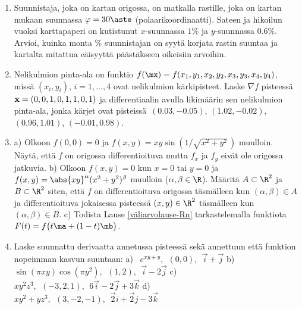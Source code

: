 \begin{enumerate}
\item
Suunnistaja, joka on kartan origossa, on matkalla rastille, joka on kartan mukaan suunnassa
$\varphi=30\aste$ (polaarikoordinaatti). Sateen ja hikoilun vuoksi karttapaperi on kutistunut
$x$-suunnassa $1\%$ ja $y$-suunnassa $0.6\%$. Arvioi, kuinka monta $\%$ suunnistajan on syytä
korjata rastin suuntaa ja kartalta mitattua eäisyyttä päästäkseen oikeisiin arvoihin.

\item Nelikulmion pinta-ala on funktio $f(\mx) = f(x_1, y_1, x_2, y_2, x_3, y_3, x_4, y_4)$,
missä $(x_i, y_i)$, $i = 1,\ldots,4$ ovat nelikulmion kärkipisteet. Laske $\nabla f$ 
pisteessä ${\bf x} = (0,0,1,0,1,1,0,1)$ ja differentiaalin avulla likimäärin sen nelikulmion
pinta-ala, jonka kärjet ovat pisteissä $\,(0.03, -0.05)$, $(1.02,-0.02)$, $(0.96, 1.01)$, 
$(-0.01, 0.98)$.

\item \label{H-udif-3: differentioituvuus}
a) Olkoon $f(0,0)=0$ ja $f(x,y)=xy\sin(1/\sqrt{x^2+y^2}\,)$ muulloin. Näytä, että $f$ on
origossa differentioituva mutta $f_x$ ja $f_y$ eivät ole origossa jatkuvia.\vspace{1mm}\newline
b) Olkoon $f(x,y)=0$ kun $x=0$ tai $y=0$ ja $f(x,y)=\abs{xy}^\alpha(x^2+y^2)^\beta$ muulloin 
($\alpha,\beta\in\R$). Määritä $A\subset\R^2$ ja $B\subset\R^2$ siten, että $f$ on
differentioituva origossa täsmälleen kun $(\alpha,\beta) \in A$ ja differentioituva jokaisessa
pisteessä $(x,y)\in\R^2$ täsmälleen kun $(\alpha,\beta) \in B$. \vspace{1mm}\newline
c) Todista Lause \ref{väliarvolause-Rn} tarkastelemalla funktiota
$F(t)=f\bigl(t\ma+(1-t)\mb\bigr)$.

\item
Laske suunnattu derivaatta annetussa pisteessä sekä annettuun että funktion nopeimman kasvun
suuntaan: \vspace{1mm}\newline
a) \ $e^{xy+y},\ \ (0,0),\ \ \vec i+\vec j$ \vspace{0.8mm}\newline
b) \ $\sin(\pi xy)\cos(\pi y^2),\ \ (1,2),\ \ \vec i-2\vec j$ \vspace{0.3mm}\newline
c) \ $xy^2z^3,\ \ (-3,2,1),\ \ 6\vec i-2\vec j+3\vec k$ \vspace{0.8mm}\newline
d) \ $ xy^2+yz^3,\ \ (3,-2,-1),\ \ \vec 2i+\vec 2j-3\vec k$


\end{enumerate}
